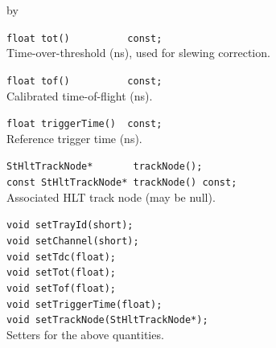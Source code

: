 \documentclass[twoside]{article}
\newcommand{\entrylabel}[1]{\mbox{\textbf{{#1}}}\hfil}%
\newenvironment{entry}
{\begin{list}{}%
    {\renewcommand{\makelabel}{\entrylabel}%
     \setlength{\labelwidth}{90pt}%
     \setlength{\leftmargin}{\labelwidth}
     \advance\leftmargin by \labelsep%
      }%
    }%
  {\end{list}}
\newcommand{\Entrylabel}[1]%
{\raisebox{0pt}[1ex][0pt]{\makebox[\labelwidth][l]%
    {\parbox[t]{\labelwidth}{\hspace{0pt}\textbf{{#1}}}}}}
\newenvironment{Entry}%
{\renewcommand{\entrylabel}{\Entrylabel}\begin{entry}}%
  {\end{entry}}
\begin{document}
\begin{Entry}
    \verb+float tot()          const;+\\
    Time-over-threshold (ns), used for slewing correction.

    \verb+float tof()          const;+\\
    Calibrated time-of-flight (ns).

    \verb+float triggerTime()  const;+\\
    Reference trigger time (ns).

    \verb+StHltTrackNode*       trackNode();+\\
    \verb+const StHltTrackNode* trackNode() const;+\\
    Associated HLT track node (may be null).

    \verb+void setTrayId(short);+\\
    \verb+void setChannel(short);+\\
    \verb+void setTdc(float);+\\
    \verb+void setTot(float);+\\
    \verb+void setTof(float);+\\
    \verb+void setTriggerTime(float);+\\
    \verb+void setTrackNode(StHltTrackNode*);+\\
    Setters for the above quantities.
\end{Entry}
\clearpage

\end{document}
